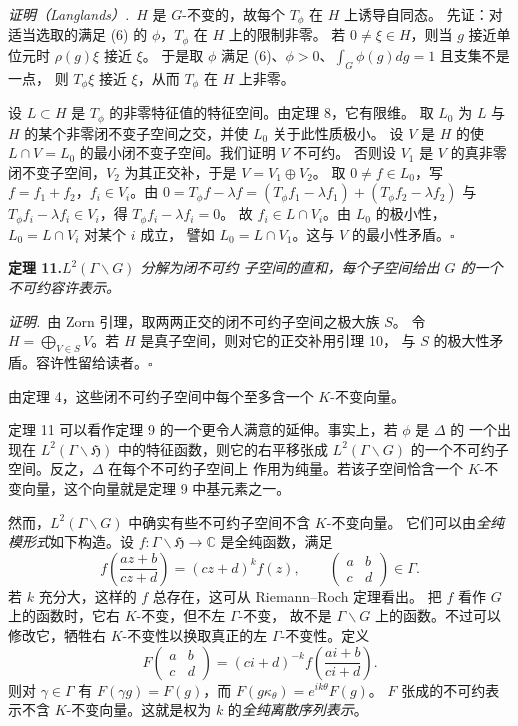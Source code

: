 \smallskip
\noindent\emph{证明（Langlands）.}\ $H$ 是 $G$-不变的，故每个 $T_{\phi}$ 在 $H$ 上诱导自同态。
先证：对适当选取的满足 (6) 的 $\phi$，$T_{\phi}$ 在 $H$ 上的限制非零。
若 $0\neq\xi\in H$，则当 $g$ 接近单位元时 $\rho(g)\xi$ 接近 $\xi$。
于是取 $\phi$ 满足 (6)、$\phi>0$、$\int_{G}\phi(g)dg=1$ 且支集不是一点，
则 $T_{\phi}\xi$ 接近 $\xi$，从而 $T_{\phi}$ 在 $H$ 上非零。

设 $L\subset H$ 是 $T_{\phi}$ 的非零特征值的特征空间。由定理 8，它有限维。
取 $L_{0}$ 为 $L$ 与 $H$ 的某个非零闭不变子空间之交，并使 $L_{0}$ 关于此性质极小。
设 $V$ 是 $H$ 的使 $L\cap V=L_{0}$ 的最小闭不变子空间。我们证明 $V$ 不可约。
否则设 $V_{1}$ 是 $V$ 的真非零闭不变子空间，$V_{2}$ 为其正交补，于是 $V=V_{1}\oplus V_{2}$。
取 $0\neq f\in L_{0}$，写 $f=f_{1}+f_{2}$，$f_{i}\in V_{i}$。由
$0=T_{\phi}f-\lambda f=(T_{\phi}f_{1}-\lambda f_{1})+(T_{\phi}f_{2}-\lambda f_{2})$
与 $T_{\phi}f_{i}-\lambda f_{i}\in V_{i}$，得 $T_{\phi}f_{i}-\lambda f_{i}=0$。
故 $f_{i}\in L\cap V_{i}$。由 $L_{0}$ 的极小性，$L_{0}=L\cap V_{i}$ 对某个 $i$ 成立，
譬如 $L_{0}=L\cap V_{1}$。这与 $V$ 的最小性矛盾。\hfill$\square$

\par\medskip\noindent\textbf{定理 11.}\quad\emph{$L^{2}(\Gamma\backslash G)$ 分解为闭不可约
子空间的直和，每个子空间给出 $G$ 的一个不可约容许表示。}

\smallskip
\noindent\emph{证明.}\ 由 Zorn 引理，取两两正交的闭不可约子空间之极大族 $S$。
令 $H=\bigoplus_{V\in S}V$。若 $H$ 是真子空间，则对它的正交补用引理 10，
与 $S$ 的极大性矛盾。容许性留给读者。\hfill$\square$

由定理 4，这些闭不可约子空间中每个至多含一个 $K$-不变向量。

定理 11 可以看作定理 9 的一个更令人满意的延伸。事实上，若 $\phi$ 是 $\Delta$ 的
一个出现在 $L^{2}(\Gamma\backslash\mathfrak{H})$ 中的特征函数，则它的右平移张成
$L^{2}(\Gamma\backslash G)$ 的一个不可约子空间。反之，$\Delta$ 在每个不可约子空间上
作用为纯量。若该子空间恰含一个 $K$-不变向量，这个向量就是定理 9 中基元素之一。

然而，$L^{2}(\Gamma\backslash G)$ 中确实有些不可约子空间不含 $K$-不变向量。
它们可以由\emph{全纯模形式}如下构造。设 $f:\Gamma\backslash\mathfrak{H}\to\mathbb{C}$
是全纯函数，满足
\[
f\!\left(\frac{az+b}{cz+d}\right)=(cz+d)^{k}f(z),\qquad
\begin{pmatrix}a&b\\c&d\end{pmatrix}\in\Gamma .
\]
若 $k$ 充分大，这样的 $f$ 总存在，这可从 Riemann--Roch 定理看出。
把 $f$ 看作 $G$ 上的函数时，它右 $K$-不变，但不左 $\Gamma$-不变，
故不是 $\Gamma\backslash G$ 上的函数。不过可以修改它，牺牲右 $K$-不变性以换取真正的左
$\Gamma$-不变性。定义
\[
F\begin{pmatrix}a&b\\c&d\end{pmatrix}=(ci+d)^{-k}f\!\left(\frac{ai+b}{ci+d}\right).
\]
则对 $\gamma\in\Gamma$ 有 $F(\gamma g)=F(g)$，而 $F(g\kappa_{\theta})=e^{ik\theta}F(g)$。
$F$ 张成的不可约表示不含 $K$-不变向量。这就是权为 $k$ 的\emph{全纯离散序列表示}。

